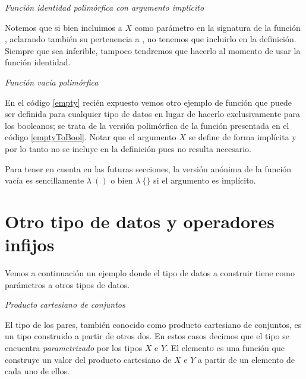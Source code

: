 \begin{agdacode}{\it Función identidad polimórfica con argumento implícito}\label{code:id}

\end{agdacode}

Notemos que si bien incluimos a $X$ como parámetro en la signatura de la función , aclarando también su pertenencia a , no tenemos que incluirlo en la definición. Siempre que sea inferible, tampoco tendremos que hacerlo al momento de usar la función identidad.

\begin{agdacode}{\it Función vacía polimórfica}\label{empty}

\end{agdacode}

En el código \ref{empty} recién expuesto vemos otro ejemplo de función que puede ser definida para cualquier tipo de datos en lugar de hacerlo exclusivamente para los booleanos; se trata de la versión polimórfica de la función  presentada en el código \ref{emptyToBool}. Notar que el argumento $X$ se define de forma implícita y por lo tanto no se incluye en la definición pues no resulta necesario.

Para tener en cuenta en las futuras secciones, la versión anónima de la función vacía es sencillamente $\lambda\ ()$ o bien $\lambda\ \{\}$ si el argumento es implícito. 

\section{Otro tipo de datos y operadores infijos} \label{agda:infix}

Vemos a continuación un ejemplo donde el tipo de datos a construir tiene como parámetros a otros tipos de datos. 
\begin{agdacode}{\it Producto cartesiano de conjuntos}\label{code:times}

\end{agdacode}

El tipo de los pares, también conocido como producto cartesiano de conjuntos, es un tipo construido a partir de otros dos. En estos casos decimos que el tipo \AgdaDatatype{$\_\times\_$} se encuentra {\it parametrizado} por los tipos $X$ e $Y$.
El elemento \AgdaInductiveConstructor{$\_,\_$} es una función que construye un valor del producto cartesiano de $X$ e $Y$ a partir de un elemento de cada uno de ellos.

